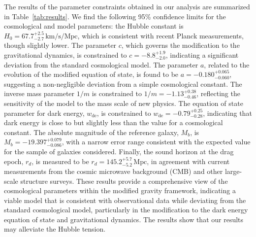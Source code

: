 \documentclass[a4paper,fleqn]{cas-sc}
\begin{document}
The results of the parameter constraints obtained in our analysis are summarized in Table~\ref{tab:results}. We find the following 95\% confidence limits for the cosmological and model parameters: the Hubble constant is \( H_0 = 67.7^{+2.5}_{-2.7} \, \text{km/s/Mpc} \), which is consistent with recent Planck measurements, though slightly lower. The parameter \( c \), which governs the modification to the gravitational dynamics, is constrained to \( c = -8.8^{+1.9}_{-2.0} \), indicating a significant deviation from the standard cosmological model. The parameter \( a \), related to the evolution of the modified equation of state, is found to be \( a = -0.180^{+0.065}_{-0.060} \), suggesting a non-negligible deviation from a simple cosmological constant. The inverse mass parameter \( 1/m \) is constrained to \( 1/m = -1.13^{+0.38}_{-0.46} \), reflecting the sensitivity of the model to the mass scale of new physics. The equation of state parameter for dark energy, \( w_{\text{de}} \), is constrained to \( w_{\text{de}} = -0.79^{+0.25}_{-0.28} \), indicating that dark energy is close to but slightly less than the value for a cosmological constant. The absolute magnitude of the reference galaxy, \( M_b \), is \( M_b = -19.397^{+0.079}_{-0.086} \), with a narrow error range consistent with the expected value for the sample of galaxies considered. Finally, the sound horizon at the drag epoch, \( r_d \), is measured to be \( r_d = 145.2^{+5.7}_{-5.2} \, \text{Mpc} \), in agreement with current measurements from the cosmic microwave background (CMB) and other large-scale structure surveys. These results provide a comprehensive view of the cosmological parameters within the modified gravity framework, indicating a viable model that is consistent with observational data while deviating from the standard cosmological model, particularly in the modification to the dark energy equation of state and gravitational dynamics. The results show that our results may alleviate the Hubble tension.
\end{document}
